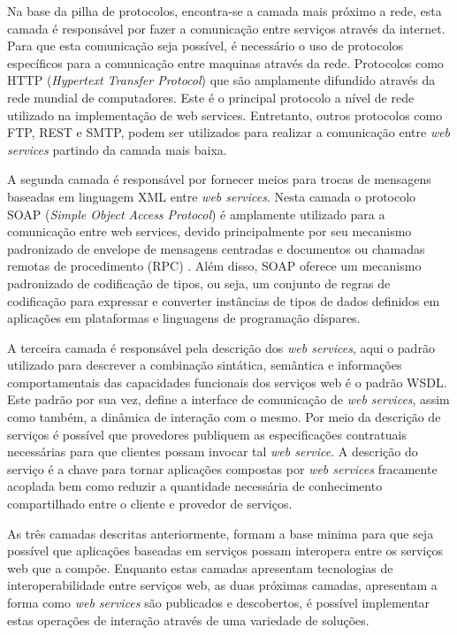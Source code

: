 Na base da pilha de protocolos, encontra-se a camada mais próximo a rede, esta camada é responsável por fazer a comunicação entre serviços através da internet. Para que esta comunicação seja possível, é necessário o uso de protocolos específicos para a comunicação entre maquinas através da rede. Protocolos como HTTP (\textit{Hypertext Transfer Protocol}) que são amplamente difundido através da rede mundial de computadores. Este é o principal protocolo a nível de rede utilizado na implementação de web services. Entretanto, outros protocolos como FTP, REST e SMTP, podem ser utilizados para realizar a comunicação entre \textit{web services} partindo da camada mais baixa.

A segunda camada é responsável por fornecer meios para trocas de mensagens baseadas em linguagem XML entre \textit{web services}. Nesta camada o protocolo SOAP (\textit{Simple Object Access Protocol}) é amplamente utilizado para a comunicação entre web services, devido principalmente por seu mecanismo padronizado de envelope de mensagens centradas e documentos ou chamadas remotas de procedimento (RPC) \cite{W3Cwebservice}. Além disso, SOAP oferece um mecanismo padronizado de codificação de tipos, ou seja, um conjunto de regras de codificação para expressar e converter instâncias de tipos de dados definidos em aplicações em plataformas e linguagens de programação díspares.

A terceira camada é responsável pela descrição dos \textit{web services}, aqui o padrão utilizado para descrever a combinação sintática, semântica e informações comportamentais das capacidades funcionais dos serviços web é o padrão WSDL. Este padrão por sua vez, define a interface de comunicação de \textit{web services}, assim como também, a dinâmica de interação com o mesmo. Por meio da descrição de serviços é possível que provedores publiquem as especificações contratuais necessárias para que clientes possam invocar tal \textit{web service}. A descrição do serviço é a chave para tornar aplicações compostas por \textit{web services} fracamente acoplada bem como reduzir a quantidade necessária de conhecimento compartilhado entre o cliente e provedor de serviços.

As três camadas descritas anteriormente, formam a base minima para que seja possível que aplicações baseadas em serviços possam interopera entre os serviços web que a compõe. Enquanto estas camadas apresentam tecnologias de interoperabilidade entre serviços web, as duas próximas camadas, apresentam a forma como \textit{web services} são publicados e descobertos, é possível implementar estas operações de interação através de uma variedade de soluções.

